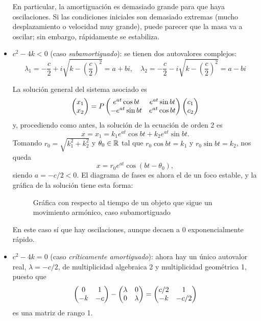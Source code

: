 \documentclass[../ecuaciones_diferenciales.tex]{subfiles}
\begin{document}
\begin{itemize}
	      En particular, la amortiguación es demasiado grande para que haya
	      oscilaciones. Si las condiciones iniciales son demasiado extremas (mucho
	      desplazamiento o velocidad muy grande), puede parecer que la masa va a
	      oscilar; sin embargo, rápidamente se estabiliza.
	\item \(c^2 - 4k < 0\) (caso \emph{subamortiguado}): se tienen dos autovalores
	      complejos:
	      \[\lambda_1 = -\frac{c}{2}+i\sqrt{k-{\left(\frac{c}{2}\right)}^2} = a + bi, \quad
		      \lambda_2 = -\frac{c}{2}-i\sqrt{k-{\left(\frac{c}{2}\right)}^2} = a - bi\]

	      La solución general del sistema asociado es
	      \[\begin{pmatrix}x_1 \\ x_2\end{pmatrix} = P \begin{pmatrix}e^{at} \cos bt & e^{at} \sin bt \\ -e^{at} \sin
		      bt & e^{at} \cos bt\end{pmatrix} \begin{pmatrix}c_1 \\ c_2\end{pmatrix}\]
	      y, procediendo como antes, la solución de la ecuación de orden 2 es
	      \[x = x_1 = k_1e^{at} \cos bt + k_2e^{at} \sin bt.\]
	      Tomando \(r_0 = \sqrt{k_1^2+k_2^2}\) y \(\theta_0 \in \mathbb{R}\) tal que \(r_0
	      \cos bt = k_1\) y \(r_0 \sin bt = k_2\), nos queda
	      \[x = r_0e^{at} \cos (bt - \theta_0),\]
	      siendo \(a = -c/2 < 0\). El diagrama de fases es ahora el de un foco
	      estable, y la gráfica de la solución tiene esta forma:
	      \begin{figure}[ht]
		      \centering
			\caption{Gráfica con respecto al tiempo de un objeto que
			  sigue un movimiento armónico, caso subamortiguado}
	      \end{figure}

	      En este caso sí que hay oscilaciones, aunque decaen a 0 exponencialmente rápido.

	\item \(c^2-4k=0\) (caso \emph{críticamente amortiguado}): ahora hay un único
	      autovalor real, \(\lambda = -c/2\), de multiplicidad algebraica 2 y
	      multiplicidad geométrica 1, puesto que
	      \[\begin{pmatrix}0 & 1 \\ -k & -c\end{pmatrix} - \begin{pmatrix}\lambda & 0 \\ 0 & \lambda\end{pmatrix} = \begin{pmatrix}c/2 & 1
			      \\ -k & -c/2\end{pmatrix}\]
	      es una matriz de rango 1.


\end{itemize}
\end{document}
